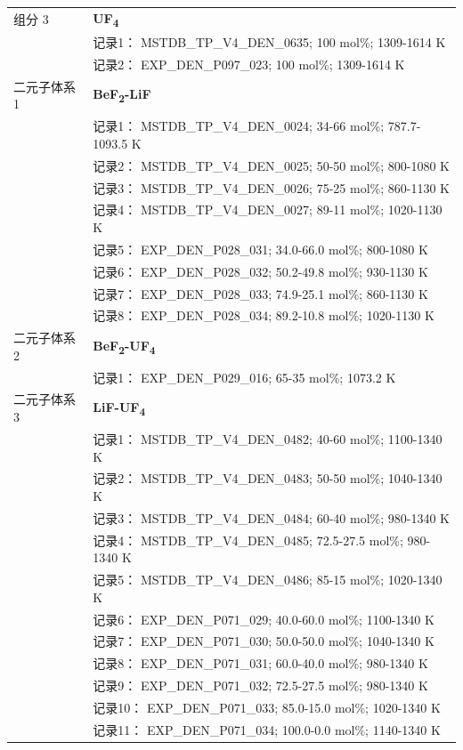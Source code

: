 \documentclass[12pt]{article}
\begin{document}
{\begin{longtable}[]{@{}
  >{\raggedright\arraybackslash}p{}
  >{\raggedright\arraybackslash}p{}@{}}
组分 3  & \textbf{UF\textsubscript{4}} \\
 & 记录1： MSTDB\_TP\_V4\_DEN\_0635; 100 mol\%; 1309-1614 K \\
 & 记录2： EXP\_DEN\_P097\_023; 100 mol\%; 1309-1614 K  \\

二元子体系 1  & \textbf{BeF\textsubscript{2}-LiF} \\
 & 记录1： MSTDB\_TP\_V4\_DEN\_0024; 34-66 mol\%; 787.7-1093.5 K \\
 & 记录2： MSTDB\_TP\_V4\_DEN\_0025; 50-50 mol\%; 800-1080 K \\
 & 记录3： MSTDB\_TP\_V4\_DEN\_0026; 75-25 mol\%; 860-1130 K \\
 & 记录4： MSTDB\_TP\_V4\_DEN\_0027; 89-11 mol\%; 1020-1130 K \\
 & 记录5： EXP\_DEN\_P028\_031; 34.0-66.0 mol\%; 800-1080 K \\
 & 记录6： EXP\_DEN\_P028\_032; 50.2-49.8 mol\%; 930-1130 K \\
 & 记录7： EXP\_DEN\_P028\_033; 74.9-25.1 mol\%; 860-1130 K \\
 & 记录8： EXP\_DEN\_P028\_034; 89.2-10.8 mol\%; 1020-1130 K  \\

二元子体系 2  & \textbf{BeF\textsubscript{2}-UF\textsubscript{4}} \\
 & 记录1： EXP\_DEN\_P029\_016; 65-35 mol\%; 1073.2 K  \\

二元子体系 3  & \textbf{LiF-UF\textsubscript{4}} \\
 & 记录1： MSTDB\_TP\_V4\_DEN\_0482; 40-60 mol\%; 1100-1340 K \\
 & 记录2： MSTDB\_TP\_V4\_DEN\_0483; 50-50 mol\%; 1040-1340 K \\
 & 记录3： MSTDB\_TP\_V4\_DEN\_0484; 60-40 mol\%; 980-1340 K \\
 & 记录4： MSTDB\_TP\_V4\_DEN\_0485; 72.5-27.5 mol\%; 980-1340 K \\
 & 记录5： MSTDB\_TP\_V4\_DEN\_0486; 85-15 mol\%; 1020-1340 K \\
 & 记录6： EXP\_DEN\_P071\_029; 40.0-60.0 mol\%; 1100-1340 K \\
 & 记录7： EXP\_DEN\_P071\_030; 50.0-50.0 mol\%; 1040-1340 K \\
 & 记录8： EXP\_DEN\_P071\_031; 60.0-40.0 mol\%; 980-1340 K \\
 & 记录9： EXP\_DEN\_P071\_032; 72.5-27.5 mol\%; 980-1340 K \\
 & 记录10： EXP\_DEN\_P071\_033; 85.0-15.0 mol\%; 1020-1340 K \\
 & 记录11： EXP\_DEN\_P071\_034; 100.0-0.0 mol\%; 1140-1340 K  \\


\end{longtable}}
\end{document}
